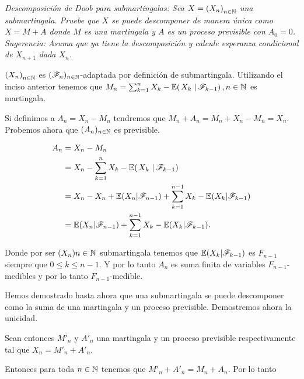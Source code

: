 \emph{
    Descomposici\'on de Doob para submartingalas: Sea $X=\left( X_n\right) _{n\in\mathbb{N}}$ una submartingala. 
    Pruebe que $X$ se puede descomponer de manera \'unica como $X=M+A$ donde $M$ es una martingala y $A$ 
    es un proceso previsible con $A_0=0$. Sugerencia: Asuma que ya tiene la descomposici\'on y calcule 
    esperanza condicional de $X_{n+1}$ dada $X_n$. 
}

\afterstatement\par\null

$\left( X_n\right) _{n\in\mathbb{N}}$ es $(\mathscr{F}_n)_{n \in \mathbb{N}}$-adaptada por definición de submartingala. Utilizando el inciso anterior tenemos
que $M_n = \sum_{k=1}^n X_k-\espc{X_k}{\F_{k-1}}, n \in \N$ es martingala.\par\null

Si definimos a $A_n = X_n - M_n$ tendremos que $M_n + A_n = M_n + X_n - M_n = X_n$. Probemos ahora que
$(A_n)_{n \in \mathbb{N}}$ es previsible.\par\null

\begin{align}
    A_n     &=      X_n - M_n                                                                   \\
            &=      X_n - \sum_{k=1}^n X_k-\espc{X_k}{\F_{k-1}}                                 \\
            &=      X_n - X_n + \E(X_n | \F_{n-1}) + \sum_{k=1}^{n-1} X_k-\E(X_k|\F_{k-1})      \\     
            &=      \E(X_n | \F_{n-1}) + \sum_{k=1}^{n-1} X_k-\E(X_k|\F_{k-1}).     
\end{align}\par\null

Donde por ser $(X_n){n \in \mathbb{N}}$ submartingala tenemos que $\mathbb{E}(X_k|\mathscr{F}_{k-1})$ es $F_{n-1}$ siempre que $0 \leq k \leq n-1$.
Y por lo tanto $A_n$ es suma finita de variables $F_{n-1}$-medibles y por lo tanto $F_{n-1}$-medible.\par\null

Hemos demostrado hasta ahora que una submartingala se puede descomponer como la suma de una martingala y un proceso previsible.
Demostremos ahora la unicidad.\par\null

Sean entonces $M'_n$ y $A'_n$ una martingala y un proceso previsible respectivamente tal que $X_n = M'_n + A'_n$.\par\null

Entonces para toda $n \in \mathbb{N}$ tenemos que $M'_n + A'_n = M_n + A_n$. Por lo tanto 

